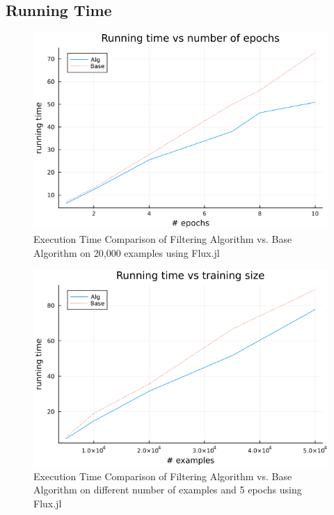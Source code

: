 \documentclass{article}
\begin{document}
\subsection{Running Time}
\begin{figure}[htbp]
    \centering
    \includegraphics[width=\textwidth]{plot_iter20k.png}
    \caption{Execution Time Comparison of Filtering Algorithm vs. Base Algorithm on 20,000 examples using Flux.jl}
    \label{fig:execution_time_comparison}
\end{figure}

\begin{figure}[htbp]
    \centering
    \includegraphics[width=\textwidth]{plot_nexamples.png}
    \caption{Execution Time Comparison of Filtering Algorithm vs. Base Algorithm on different number of examples and 5 epochs using Flux.jl}
    \label{fig:execution_time_examples_comparison}
\end{figure}
 
\end{document}
